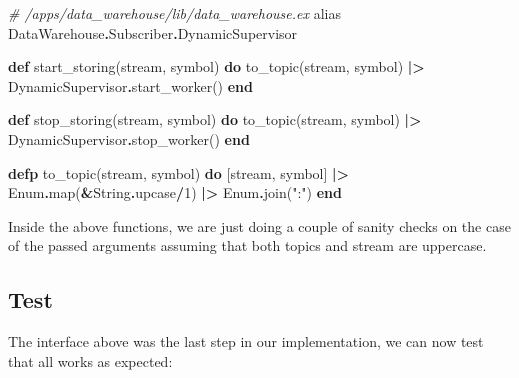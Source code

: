 \documentclass[
]{book}
\newenvironment{Shaded}{\begin{snugshade}}{\end{snugshade}}
\newcommand{\CommentTok}[1]{\textcolor[rgb]{0.56,0.35,0.01}{\textit{#1}}}
\newcommand{\ConstantTok}[1]{\textcolor[rgb]{0.00,0.00,0.00}{#1}}
\newcommand{\DecValTok}[1]{\textcolor[rgb]{0.00,0.00,0.81}{#1}}
\newcommand{\ImportTok}[1]{#1}
\newcommand{\KeywordTok}[1]{\textcolor[rgb]{0.13,0.29,0.53}{\textbf{#1}}}
\newcommand{\NormalTok}[1]{#1}
\newcommand{\OperatorTok}[1]{\textcolor[rgb]{0.81,0.36,0.00}{\textbf{#1}}}
\newcommand{\StringTok}[1]{\textcolor[rgb]{0.31,0.60,0.02}{#1}}
\begin{document}
\begin{Shaded}
\begin{Highlighting}[]
  \CommentTok{\# /apps/data\_warehouse/lib/data\_warehouse.ex}
  \ImportTok{alias} \ConstantTok{DataWarehouse}\OperatorTok{.}\ConstantTok{Subscriber}\OperatorTok{.}\ConstantTok{DynamicSupervisor}

  \KeywordTok{def}\NormalTok{ start\_storing(stream, symbol) }\KeywordTok{do}
\NormalTok{    to\_topic(stream, symbol)}
    \OperatorTok{|\textgreater{}} \ConstantTok{DynamicSupervisor}\OperatorTok{.}\NormalTok{start\_worker()}
  \KeywordTok{end}

  \KeywordTok{def}\NormalTok{ stop\_storing(stream, symbol) }\KeywordTok{do}
\NormalTok{    to\_topic(stream, symbol)}
    \OperatorTok{|\textgreater{}} \ConstantTok{DynamicSupervisor}\OperatorTok{.}\NormalTok{stop\_worker()}
  \KeywordTok{end}

  \KeywordTok{defp}\NormalTok{ to\_topic(stream, symbol) }\KeywordTok{do}
\NormalTok{    [stream, symbol]}
    \OperatorTok{|\textgreater{}} \ConstantTok{Enum}\OperatorTok{.}\NormalTok{map(}\OperatorTok{\&}\ConstantTok{String}\OperatorTok{.}\NormalTok{upcase}\OperatorTok{/}\DecValTok{1}\NormalTok{)}
    \OperatorTok{|\textgreater{}} \ConstantTok{Enum}\OperatorTok{.}\NormalTok{join(}\StringTok{":"}\NormalTok{)}
  \KeywordTok{end}
\end{Highlighting}
\end{Shaded}

Inside the above functions, we are just doing a couple of sanity checks on the case of the passed arguments assuming that both topics and stream are uppercase.

\hypertarget{test}{%
\subsection{Test}\label{test}}

The interface above was the last step in our implementation, we can now test that all works as expected:
\end{document}
